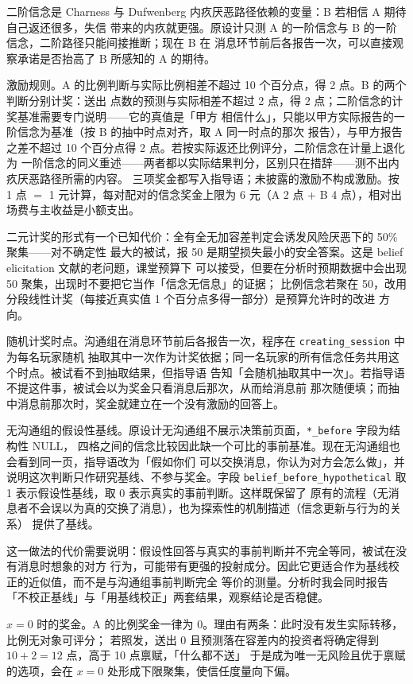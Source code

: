 \documentclass[10pt,a4paper]{ctexart}
\newcommand{\code}[1]{\texttt{#1}}
\begin{document}
二阶信念是 Charness 与 Dufwenberg 内疚厌恶路径依赖的变量：B 若相信 A 期待自己返还很多，失信
带来的内疚就更强。原设计只测 A 的一阶信念与 B 的一阶信念，二阶路径只能间接推断；现在 B 在
消息环节前后各报告一次，可以直接观察承诺是否抬高了 B 所感知的 A 的期待。

激励规则。A 的比例判断与实际比例相差不超过 10 个百分点，得 2 点。B 的两个判断分别计奖：送出
点数的预测与实际相差不超过 2 点，得 2 点；二阶信念的计奖基准需要专门说明——它的真值是「甲方
相信什么」，只能以甲方实际报告的一阶信念为基准（按 B 的抽中时点对齐，取 A 同一时点的那次
报告），与甲方报告之差不超过 10 个百分点得 2 点。若按实际返还比例评分，二阶信念在计量上退化为
一阶信念的同义重述——两者都以实际结果判分，区别只在措辞——测不出内疚厌恶路径所需的内容。
三项奖金都写入指导语；未披露的激励不构成激励。按 1 点 $=$ 1 元计算，每对配对的信念奖金上限为
6 元（A 2 点 + B 4 点），相对出场费与主收益是小额支出。

二元计奖的形式有一个已知代价：全有全无加容差判定会诱发风险厌恶下的 50\% 聚集——对不确定性
最大的被试，报 50 是期望损失最小的安全答案。这是 belief elicitation 文献的老问题，课堂预算下
可以接受，但要在分析时预期数据中会出现 50 聚集，出现时不要把它当作「信念无信息」的证据；
比例信念若聚在 50，改用分段线性计奖（每接近真实值 1 个百分点多得一部分）是预算允许时的改进
方向。

随机计奖时点。沟通组在消息环节前后各报告一次，程序在 \code{creating\_session} 中为每名玩家随机
抽取其中一次作为计奖依据；同一名玩家的所有信念任务共用这个时点。被试看不到抽取结果，但指导语
告知「会随机抽取其中一次」。若指导语不提这件事，被试会以为奖金只看消息后那次，从而给消息前
那次随便填；而抽中消息前那次时，奖金就建立在一个没有激励的回答上。

无沟通组的假设性基线。原设计无沟通组不展示决策前页面，\code{*\_before} 字段为结构性 NULL，
四格之间的信念比较因此缺一个可比的事前基准。现在无沟通组也会看到同一页，指导语改为「假如你们
可以交换消息，你认为对方会怎么做」，并说明这次判断只作研究基线、不参与奖金。字段
\code{belief\_before\_hypothetical} 取 1 表示假设性基线，取 0 表示真实的事前判断。这样既保留了
原有的流程（无消息者不会误以为真的交换了消息），也为探索性的机制描述（信念更新与行为的关系）
提供了基线。

这一做法的代价需要说明：假设性回答与真实的事前判断并不完全等同，被试在没有消息时想象的对方
行为，可能带有更强的投射成分。因此它更适合作为基线校正的近似值，而不是与沟通组事前判断完全
等价的测量。分析时我会同时报告「不校正基线」与「用基线校正」两套结果，观察结论是否稳健。

$x=0$ 时的奖金。A 的比例奖金一律为 0。理由有两条：此时没有发生实际转移，比例无对象可评分；
若照发，送出 0 且预测落在容差内的投资者将确定得到 $10+2=12$ 点，高于 10 点禀赋，「什么都不送」
于是成为唯一无风险且优于禀赋的选项，会在 $x=0$ 处形成下限聚集，使信任度量向下偏。
\end{document}
